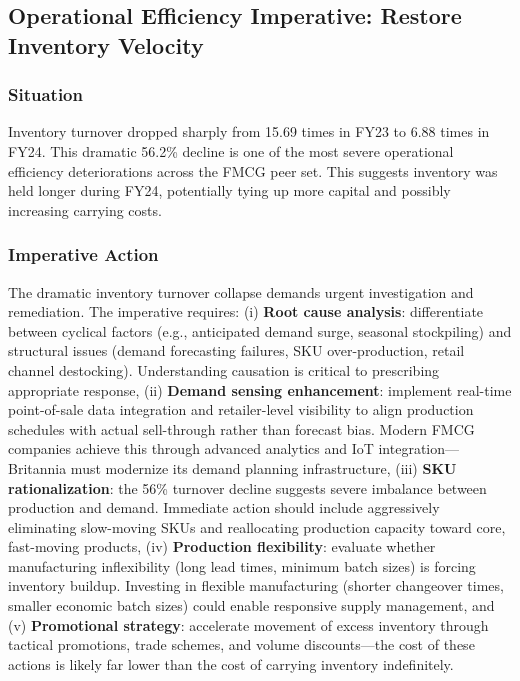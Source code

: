 \documentclass[12pt, a4paper]{report}
\begin{document}
\subsection{Operational Efficiency Imperative: Restore Inventory Velocity}

\subsubsection{Situation}
Inventory turnover dropped sharply from 15.69 times in FY23 to 6.88 times in FY24. This dramatic 56.2\% decline is one of the most severe operational efficiency deteriorations across the FMCG peer set. This suggests inventory was held longer during FY24, potentially tying up more capital and possibly increasing carrying costs.

\subsubsection{Imperative Action}
The dramatic inventory turnover collapse demands urgent investigation and remediation. The imperative requires: (i) \textbf{Root cause analysis}: differentiate between cyclical factors (e.g., anticipated demand surge, seasonal stockpiling) and structural issues (demand forecasting failures, SKU over-production, retail channel destocking). Understanding causation is critical to prescribing appropriate response, (ii) \textbf{Demand sensing enhancement}: implement real-time point-of-sale data integration and retailer-level visibility to align production schedules with actual sell-through rather than forecast bias. Modern FMCG companies achieve this through advanced analytics and IoT integration—Britannia must modernize its demand planning infrastructure, (iii) \textbf{SKU rationalization}: the 56\% turnover decline suggests severe imbalance between production and demand. Immediate action should include aggressively eliminating slow-moving SKUs and reallocating production capacity toward core, fast-moving products, (iv) \textbf{Production flexibility}: evaluate whether manufacturing inflexibility (long lead times, minimum batch sizes) is forcing inventory buildup. Investing in flexible manufacturing (shorter changeover times, smaller economic batch sizes) could enable responsive supply management, and (v) \textbf{Promotional strategy}: accelerate movement of excess inventory through tactical promotions, trade schemes, and volume discounts—the cost of these actions is likely far lower than the cost of carrying inventory indefinitely.
\end{document}
